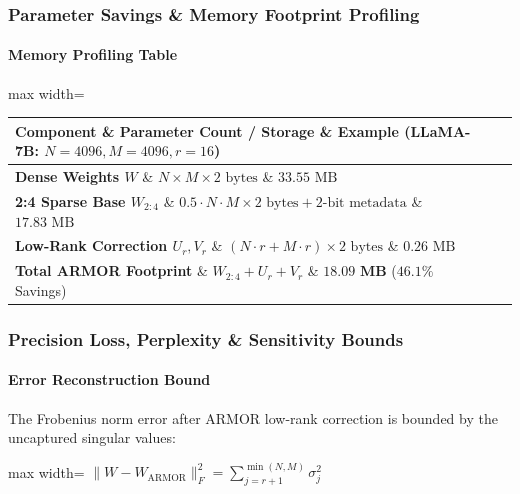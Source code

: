 \subsubsection*{Parameter Savings \& Memory Footprint Profiling}

\paragraph{Memory Profiling Table}

\begin{center}
\begin{adjustbox}{max width=\columnwidth}
\renewcommand{\arraystretch}{1.2}
\begin{tabular}{lll}
\toprule
Component \& Parameter Count / Storage \& Example (LLaMA-7B: $N=4096, M=4096, r=16$) \\
\midrule
\textbf{Dense Weights $W$} \& $N \times M \times 2 \text{ bytes}$ \& $33.55 \text{ MB}$ \\
\textbf{2:4 Sparse Base $W_{2:4}$} \& $0.5 \cdot N \cdot M \times 2 \text{ bytes} + 2\text{-bit metadata}$ \& $17.83 \text{ MB}$ \\
\textbf{Low-Rank Correction $U_r, V_r$} \& $(N \cdot r + M \cdot r) \times 2 \text{ bytes}$ \& $0.26 \text{ MB}$ \\
\textbf{Total ARMOR Footprint} \& $W_{2:4} + U_r + V_r$ \& $\mathbf{18.09\text{ MB}}$ ($46.1\%$ Savings) \\

\bottomrule
\end{tabular}
\end{adjustbox}
\end{center}

\subsubsection*{Precision Loss, Perplexity \& Sensitivity Bounds}

\paragraph{Error Reconstruction Bound}

The Frobenius norm error after ARMOR low-rank correction is bounded by the uncaptured singular values:

\begin{center}
\begin{adjustbox}{max width=\columnwidth}
$\displaystyle
\| W - W_{\text{ARMOR}} \|_F^2 = \sum_{j=r+1}^{\min(N, M)} \sigma_j^2
$
\end{adjustbox}
\end{center}

